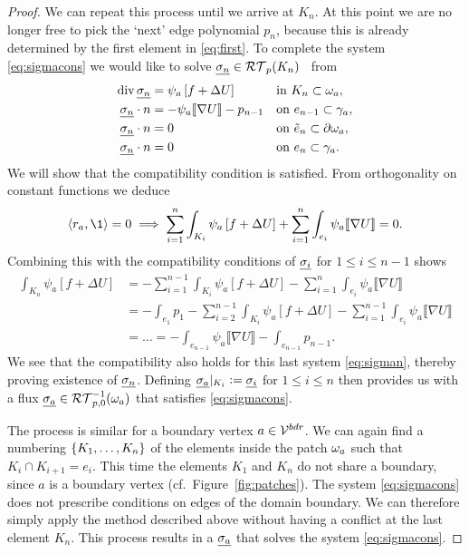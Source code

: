 \documentclass[thesis.tex]{subfiles}
\begin{document}
\begin{proof}
  We can repeat this process until we arrive at $K_n$. At this point we are no longer
  free to pick the `next'  edge polynomial $p_n$, because this is already determined by the first element in \eqref{eq:first}.
  To complete the system \eqref{eq:sigmacons} we would like to solve $\underline{\sigma_n} \in \mathcal{RT}_p(K_n)$~
  from
  \begin{equation}
    \label{eq:sigman}
  \begin{alignedat}{3}
    \operatorname{div} \underline{\sigma_n} &= \psi_a \left [f + \Delta U\right] && \quad\text{in }  K_n\subset \omega_a ,\\
    \underline{\sigma_n} \cdot n  &= -\psi_a \llbracket \nabla U \rrbracket - p_{n-1} && \quad \text{on } e_{n-1} \subset \gamma_a,\\
    \underline{\sigma_n} \cdot n  &= 0 && \quad \text{on } \tilde e_n \subset \partial \omega_a,\\
    \underline{\sigma_n} \cdot n  &= 0 && \quad \text{on } e_{n} \subset \gamma_a.
  \end{alignedat}
\end{equation} 
  We will show that the compatibility condition is satisfied.
  From orthogonality on constant functions we deduce
  \[
    \ip{r_a, \1} = 0 \implies \sum_{i = 1}^n \int_{K_i} \psi_a \left[f+\Delta U\right] + \sum_{i = 1}^n \int_{e_i} \psi_a \llbracket \nabla U \rrbracket = 0.
  \]
  Combining this with the compatibility conditions of $\underline{\sigma_i}$ for $1 \leq i \leq n-1$ shows
  \begin{align*}
    \int_{K_n} \psi_a  \left[ f + \Delta U \right] &=- \sum_{i = 1}^{n-1} \int_{K_i} \psi_a \left[ f + \Delta U \right] - \sum_{i=1}^n \int_{e_i} \psi_a \llbracket \nabla U \rrbracket \\
    &=   - \int_{e_1} p_1 -  \sum_{i = 2}^{n-1} \int_{K_i} \psi_a \left[ f + \Delta U \right] - \sum_{i=1}^{n-1} \int_{e_i} \psi_a \llbracket \nabla U \rrbracket \\
    &= \dots =- \int_{e_{n-1}} \psi_a \llbracket \nabla U \rrbracket - \int_{e_{n-1}} p_{n-1}.
  \end{align*}
  We see that the compatibility also holds for this last system \eqref{eq:sigman}, thereby proving existence of $\underline{\sigma_n}$.
  Defining $\underline{\sigma_a}|_{K_i} := \underline{\sigma_i}$ for $1 \leq i \leq n$ then provides us with a flux $\underline{\sigma_a} \in \mathcal{RT}_{p,0}^{-1}(\omega_a)$ that satisfies \eqref{eq:sigmacons}.

  The process is similar for a boundary vertex $a \in \mathcal{V}^{bdr}$.  We can again find a numbering $\set{K_1, \dots, K_n}$
  of the elements inside the patch $\omega_a$ such that $K_i \cap K_{i+1} = e_i$. This time the
  elements $K_1$ and $K_n$ do not share a boundary, since $a$ is a boundary vertex (cf.~Figure~\ref{fig:patches}). 
  The system \eqref{eq:sigmacons} does not prescribe conditions on edges of the domain boundary.
  We can therefore simply apply the method described above without having a conflict at the last element $K_n$.
  This process results in a $\underline{\sigma_a}$ that solves the system \eqref{eq:sigmacons}.

  \end{proof}
\end{document}
